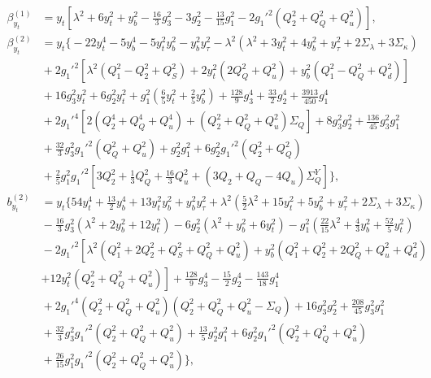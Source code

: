 \documentclass[preprint,amsmath,amssymb,aps,superscriptaddress,prd,showpacs,floatfix,nofootinbib]{revtex4-1}
\begin{document}
\begin{subequations}
\begin{align}
\beta_{y_t}^{(1)}&=y_t\left [ \lambda^2+6y_t^2+y_b^2-\frac{16}{3}g_3^2-3g_2^2-\frac{13}{15}g_1^2-2g_1'^2\left ( Q_2^2+Q_Q^2+Q_u^2 \right )\right ],\label{eq:USSMYu22BetaOneLoop}\\
\beta_{y_t}^{(2)}&=y_t\bigg \{-22y_t^4-5y_b^4-5y_t^2y_b^2-y_b^2y_\tau^2-\lambda^2 \left ( \lambda^2+3y_t^2+4y_b^2+y_\tau^2+2\Sigma_\lambda + 3\Sigma_\kappa\right )\nonumber\\
&{}+2g_1'^2\left [ \lambda^2\left ( Q_1^2-Q_2^2+Q_S^2 \right )+2y_t^2\left ( 2Q_Q^2+Q_u^2\right )+y_b^2\left ( Q_1^2-Q_Q^2+Q_d^2\right )\right ]\nonumber\\
&{}+16g_3^2y_t^2+6g_2^2y_t^2+g_1^2\left ( \frac{6}{5}y_t^2+\frac{2}{5}y_b^2\right )+\frac{128}{9}g_3^4+\frac{33}{2}g_2^4+\frac{3913}{450}g_1^4\nonumber\\
&{}+2g_1'^4\left [ 2\left ( Q_2^4+Q_Q^4+Q_u^4\right )+\left ( Q_2^2+Q_Q^2+Q_u^2\right )\Sigma_{Q}\right ]+8g_3^2g_2^2+\frac{136}{45}g_3^2g_1^2\nonumber\\
&{}+\frac{32}{3}g_3^2g_1'^2\left ( Q_Q^2+Q_u^2\right )+g_2^2g_1^2+6g_2^2g_1'^2\left ( Q_2^2+Q_Q^2\right )\nonumber\\
&{}+\frac{2}{5}g_1^2g_1'^2\left [ 3Q_2^2+\frac{1}{3}Q_Q^2+\frac{16}{3}Q_u^2+\left ( 3Q_2+Q_Q-4Q_u\right )\Sigma_{Q}^Y\right ]\bigg \},\label{eq:USSMYu22BetaTwoLoop}\\
b_{y_t}^{(2)}&=y_t\bigg \{ 54y_t^4+\frac{13}{2}y_b^4+13y_t^2y_b^2+y_b^2y_\tau^2+\lambda^2\left ( \frac{5}{2}\lambda^2+15y_t^2+5y_b^2+y_\tau^2+2\Sigma_\lambda+3\Sigma_\kappa \right )\nonumber\\
&{}-\frac{16}{3}g_3^2\left ( \lambda^2+2y_b^2+12y_t^2\right )-6g_2^2\left ( \lambda^2+y_b^2+6y_t^2\right )-g_1^2\left ( \frac{22}{15}\lambda^2+\frac{4}{3}y_b^2+\frac{52}{5}y_t^2\right )\nonumber\\
&{}-2g_1'^2\left [ \lambda^2 \left (Q_1^2+2Q_2^2+Q_S^2+Q_Q^2+Q_u^2 \right )+y_b^2\left ( Q_1^2+Q_2^2+2Q_Q^2+Q_u^2+Q_d^2\right )\right.\nonumber\\
&{}\left.+12y_t^2\left ( Q_2^2+Q_Q^2+Q_u^2\right )\right ]+\frac{128}{9}g_3^4-\frac{15}{2}g_2^4-\frac{143}{18}g_1^4\nonumber\\
&{}+2g_1'^4\left ( Q_2^2+Q_Q^2+Q_u^2\right )\left ( Q_2^2+Q_Q^2+Q_u^2-\Sigma_{Q}\right )+16g_3^2g_2^2+\frac{208}{45}g_3^2g_1^2\nonumber\\
&{}+\frac{32}{3}g_3^2g_1'^2\left ( Q_2^2+Q_Q^2+Q_u^2\right )+\frac{13}{5}g_2^2g_1^2+6g_2^2g_1'^2\left ( Q_2^2+Q_Q^2+Q_u^2 \right )\nonumber\\
&{}+\frac{26}{15}g_1^2g_1'^2\left ( Q_2^2+Q_Q^2+Q_u^2 \right )\bigg \},\label{eq:USSMYu22Ot2Coeff}
\end{align}
\end{subequations}
\end{document}
